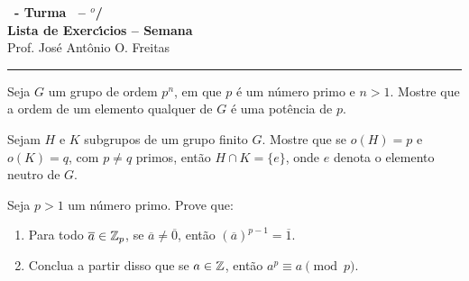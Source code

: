 \documentclass[12pt]{exam}
\begin{document}
\begin{center}

    {\Large\bf \disciplina\ - Turma \turma\ -- \semestre$^{o}$/\ano} \\ \vspace{9pt} {\large\bf
        Lista de Exerc{\'\i}cios -- Semana \numerosemana}\\ \vspace{9pt} Prof. Jos{\'e} Ant{\^o}nio O. Freitas
    \end{center}
    \hrule

    \vspace{.6cm}

    \questao{} Seja $G$ um grupo de ordem $p^n$, em que $p$ \'e um n\'umero primo e $n > 1$. Mostre que a ordem de um elemento qualquer de $G$ \'e uma pot\^encia de $p$.

    \vspace{.3cm}

    \questao{} Sejam $H$ e $K$ subgrupos de um grupo finito $G$. Mostre que se $o(H) = p$ e $o(K) = q$, com $p \ne q$ primos, ent\~ao $H \cap K = \{e\}$, onde $e$ denota o elemento neutro de $G$.

    \vspace{.3cm}

    \questao{} Seja $p > 1$ um n\'umero primo. Prove que:
    \begin{enumerate}[label=({\alph*})]
      \item Para todo $\overline{a} \in \mathbb{Z}_p$, se $\overline{a} \ne \overline{0}$, ent\~ao $(\overline{a})^{p-1} = \overline{1}$.

      \item Conclua a partir disso que se $a \in \mathbb{Z}$, ent\~ao $a^p \equiv a \pmod p$.
    \end{enumerate}

    \vspace{.3cm}
\end{document}
